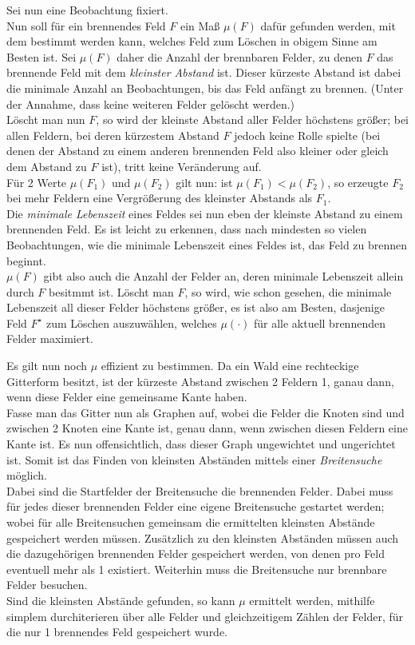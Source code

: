 Sei nun eine Beobachtung fixiert.\\
Nun soll für ein brennendes Feld $F$ ein Maß $\mu(F)$ dafür gefunden werden, mit dem bestimmt werden kann, welches Feld zum Löschen in obigem Sinne am Besten ist. Sei $\mu(F)$ daher die Anzahl der brennbaren Felder, zu denen $F$ das brennende Feld mit dem \emph{kleinster Abstand} ist. Dieser kürzeste Abstand ist dabei die minimale Anzahl an Beobachtungen, bis das Feld anfängt zu brennen. (Unter der Annahme, dass keine weiteren Felder gelöscht werden.)\\
Löscht man nun $F$, so wird der kleinste Abstand aller Felder höchstens größer; bei allen Feldern, bei deren kürzestem Abstand $F$ jedoch keine Rolle spielte (bei denen der Abstand zu einem anderen brennenden Feld also kleiner oder gleich dem Abstand zu $F$ ist), tritt keine Veränderung auf.\\
Für 2 Werte $\mu(F_1)$ und $\mu(F_2)$ gilt nun: ist $\mu(F_1) < \mu(F_2)$, so erzeugte $F_2$ bei mehr Feldern eine Vergrößerung des kleinster Abstands als $F_1$.\\
Die \emph{minimale Lebenszeit} eines Feldes sei nun eben der kleinste Abstand zu einem brennenden Feld. Es ist leicht zu erkennen, dass nach mindesten so vielen Beobachtungen, wie die minimale Lebenszeit eines Feldes ist, das Feld zu brennen beginnt.\\
$\mu(F)$ gibt also auch die Anzahl der Felder an, deren minimale Lebenszeit allein durch $F$ besitmmt ist. Löscht man $F$, so wird, wie schon gesehen, die minimale Lebenszeit all dieser Felder höchstens größer, es ist also am Besten, dasjenige Feld $F^\star$ zum Löschen auszuwählen, welches $\mu(\cdot)$ für alle aktuell brennenden Felder maximiert.

Es gilt nun noch $\mu$ effizient zu bestimmen. Da ein Wald eine rechteckige Gitterform besitzt, ist der kürzeste Abstand zwischen 2 Feldern 1, ganau dann, wenn diese Felder eine gemeinsame Kante haben.\\
Fasse man das Gitter nun als Graphen auf, wobei die Felder die Knoten sind und zwischen 2 Knoten eine Kante ist, genau dann, wenn zwischen diesen Feldern eine Kante ist. Es nun offensichtlich, dass dieser Graph ungewichtet und ungerichtet  ist. Somit ist das Finden von kleinsten Abständen mittels einer \emph{Breitensuche} möglich.\\
Dabei sind die Startfelder der Breitensuche die brennenden Felder. Dabei muss für jedes dieser brennenden Felder eine eigene Breitensuche gestartet werden; wobei für alle Breitensuchen gemeinsam die ermittelten kleinsten Abstände gespeichert werden müssen. Zusätzlich zu den kleinsten Abständen müssen auch die dazugehörigen brennenden Felder gespeichert werden, von denen pro Feld eventuell mehr als 1 existiert. Weiterhin muss die Breitensuche nur brennbare Felder besuchen.\\
Sind die kleinsten Abstände gefunden, so kann $\mu$ ermittelt werden, mithilfe simplem durchiterieren über alle Felder und gleichzeitigem Zählen der Felder, für die nur 1 brennendes Feld gespeichert wurde.

